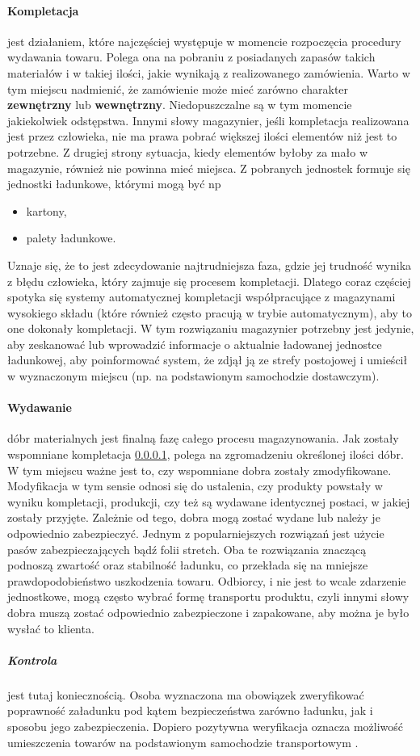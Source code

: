 	\paragraph{Kompletacja} \label{c4:kompletacja} jest działaniem, które najczęściej występuje w momencie rozpoczęcia procedury
	wydawania towaru. Polega ona na pobraniu z posiadanych zapasów takich materiałów i w takiej ilości, jakie
	wynikają z realizowanego zamówienia. Warto w tym miejscu nadmienić, że zamówienie może mieć zarówno
	charakter \textbf{zewnętrzny} lub \textbf{wewnętrzny}. Niedopuszczalne są w tym momencie jakiekolwiek odstępstwa. Innymi słowy
	magazynier, jeśli kompletacja realizowana jest przez człowieka, nie ma prawa pobrać większej ilości elementów niż
	jest to potrzebne. Z drugiej strony sytuacja, kiedy elementów byłoby za mało w magazynie, również nie 
	powinna mieć miejsca. Z pobranych jednostek formuje się jednostki ładunkowe, którymi mogą być np
	\begin{itemize}
		\item kartony,
		\item palety ładunkowe.
	\end{itemize}
	Uznaje się, że to jest zdecydowanie najtrudniejsza faza, gdzie jej trudność wynika z błędu człowieka, który zajmuje się
	procesem kompletacji. Dlatego coraz częściej spotyka się systemy automatycznej kompletacji współpracujące z magazynami
	wysokiego składu (które również często pracują w trybie automatycznym), aby to one dokonały kompletacji. W tym rozwiązaniu
	magazynier potrzebny jest jedynie, aby zeskanować lub wprowadzić informacje o aktualnie ładowanej jednostce ładunkowej, aby
	poinformować system, że zdjął ją ze strefy postojowej i umieścił w wyznaczonym miejscu (np. na podstawionym samochodzie
	dostawczym). 	
	\paragraph{Wydawanie} dóbr materialnych jest finalną fazę całego procesu magazynowania. 
	Jak zostały wspomniane kompletacja \ref{c4:kompletacja}, polega na zgromadzeniu określonej ilości dóbr. W tym miejscu
	ważne jest to, czy wspomniane dobra zostały zmodyfikowane. Modyfikacja w tym sensie odnosi się do ustalenia, czy produkty
	powstały w wyniku kompletacji, produkcji, czy też są wydawane identycznej postaci, w jakiej zostały przyjęte. Zależnie
	od tego, dobra mogą zostać wydane lub należy je odpowiednio zabezpieczyć. Jednym z popularniejszych rozwiązań jest użycie
	pasów zabezpieczających bądź folii stretch. Oba te rozwiązania znaczącą podnoszą zwartość oraz stabilność ładunku, co
	przekłada się na mniejsze prawdopodobieństwo uszkodzenia towaru. Odbiorcy, i nie jest to wcale zdarzenie jednostkowe,
	mogą często wybrać formę transportu produktu, czyli innymi słowy dobra muszą zostać odpowiednio zabezpieczone i zapakowane,
	aby można je było wysłać to klienta. 
		\subparagraph{Kontrola} jest tutaj koniecznością. Osoba wyznaczona ma obowiązek zweryfikować 
		popra\-wność załadunku pod kątem bezpieczeństwa zarówno ładunku, jak i sposobu jego 
		zabezpieczenia. Dopiero pozytywna weryfikacja oznacza możliwość umieszczenia
		towarów na podstawionym samochodzie transportowym \cite{PL_FM}.
		
